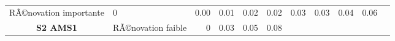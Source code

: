 \documentclass[]{article}
\begin{document}
\begin{longtable}[]{@{}clrrrrrrrrr@{}}
\begin{minipage}[t]{0.17\columnwidth}
RÃ©novation importante\strut
\end{minipage} & \begin{minipage}[t]{0.05\columnwidth}\raggedleft\strut
0\strut
\end{minipage} & \begin{minipage}[t]{0.05\columnwidth}\raggedleft\strut
0.00\strut
\end{minipage} & \begin{minipage}[t]{0.05\columnwidth}\raggedleft\strut
0.01\strut
\end{minipage} & \begin{minipage}[t]{0.05\columnwidth}\raggedleft\strut
0.02\strut
\end{minipage} & \begin{minipage}[t]{0.05\columnwidth}\raggedleft\strut
0.02\strut
\end{minipage} & \begin{minipage}[t]{0.05\columnwidth}\raggedleft\strut
0.03\strut
\end{minipage} & \begin{minipage}[t]{0.05\columnwidth}\raggedleft\strut
0.03\strut
\end{minipage} & \begin{minipage}[t]{0.05\columnwidth}\raggedleft\strut
0.04\strut
\end{minipage} & \begin{minipage}[t]{0.05\columnwidth}\raggedleft\strut
0.06\strut
\end{minipage}\tabularnewline
\begin{minipage}[t]{0.12\columnwidth}\centering\strut
\textbf{S2 AMS1}\strut
\end{minipage} & \begin{minipage}[t]{0.17\columnwidth}\raggedright\strut
RÃ©novation faible\strut
\end{minipage} & \begin{minipage}[t]{0.05\columnwidth}\raggedleft\strut
0\strut
\end{minipage} & \begin{minipage}[t]{0.05\columnwidth}\raggedleft\strut
0.03\strut
\end{minipage} & \begin{minipage}[t]{0.05\columnwidth}\raggedleft\strut
0.05\strut
\end{minipage} & \begin{minipage}[t]{0.05\columnwidth}\raggedleft\strut
0.08\strut
\end{minipage} & \begin{minipage}[t]{0.05\columnwidth}\raggedleft\strut

\end{minipage}
\end{longtable}
\end{document}
